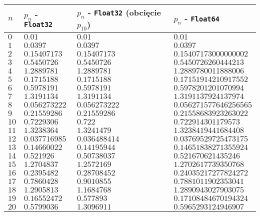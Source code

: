 \documentclass[12pt]{article}
\begin{document}
        \begin{table}[h!]
            \centering
            \begin{tabularx}{0.775\textwidth}{l l l l}
            \hline
            $n$ & $p_n$ - \texttt{Float32} & $p_n$ - \texttt{Float32} (obcięcie $p_{10}$) & $p_n$ - \texttt{Float64} \\
            \hline
            $0$ & $0.01$ & $0.01$ & $0.01$ \\
            $1$ & $0.0397$ & $0.0397$ & $0.0397$ \\
            $2$ & $0.15407173$ & $0.15407173$ & $0.15407173000000002$ \\
            $3$ & $0.5450726$ & $0.5450726$ & $0.5450726260444213$ \\
            $4$ & $1.2889781$ & $1.2889781$ & $1.2889780011888006$ \\
            $5$ & $0.1715188$ & $0.1715188$ & $0.17151914210917552$ \\
            $6$ & $0.5978191$ & $0.5978191$ & $0.5978201201070994$ \\
            $7$ & $1.3191134$ & $1.3191134$ & $1.3191137924137974$ \\
            $8$ & $0.056273222$ & $0.056273222$ & $0.056271577646256565$ \\
            $9$ & $0.21559286$ & $0.21559286$ & $0.21558683923263022$ \\
            $10$ & $0.7229306$ & $\mathbf{0.722}$ & $0.722914301179573$ \\
            $11$ & $1.3238364$ & $1.3241479$ & $1.3238419441684408$ \\
            $12$ & $0.037716985$ & $0.036488414$ & $0.03769529725473175$ \\
            $13$ & $0.14660022$ & $0.14195944$ & $0.14651838271355924$ \\
            $14$ & $0.521926$ & $0.50738037$ & $0.521670621435246$ \\
            $15$ & $1.2704837$ & $1.2572169$ & $1.2702617739350768$ \\
            $16$ & $0.2395482$ & $0.28708452$ & $0.24035217277824272$ \\
            $17$ & $0.7860428$ & $0.9010855$ & $0.7881011902353041$ \\
            $18$ & $1.2905813$ & $1.1684768$ & $1.2890943027903075$ \\
            $19$ & $0.16552472$ & $0.577893$ & $0.17108484670194324$ \\
            $20$ & $0.5799036$ & $1.3096911$ & $0.5965293124946907$ \\

\end{tabularx}
\end{table}
\end{document}
